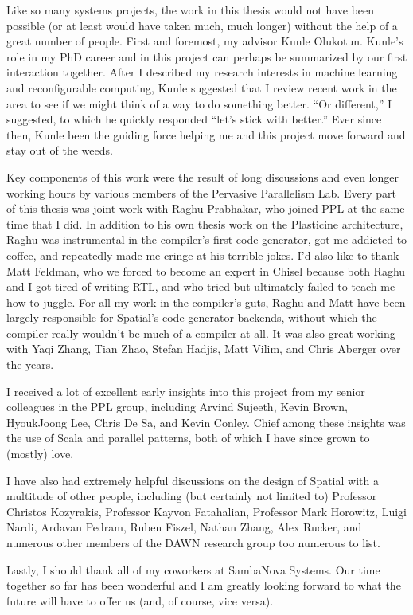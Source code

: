 Like so many systems projects, the work in this thesis would not have been
possible (or at least would have taken much, much longer) without the help of
a great number of people. First and foremost, my advisor Kunle Olukotun.
Kunle's role in my PhD career and in this project can perhaps be summarized by
our first interaction together. After I described my research interests in
machine learning and reconfigurable computing, Kunle suggested that I review recent
work in the area to see if we might think of a way to do something better.
``Or different,'' I suggested, to which he quickly responded ``let's stick
with better.''  Ever since then, Kunle been the guiding force helping me and this
project move forward and stay out of the weeds.

Key components of this work were the result of long discussions and even longer
working hours by various members of the Pervasive Parallelism Lab.
Every part of this thesis was joint work with Raghu Prabhakar, who joined PPL
at the same time that I did. In addition to his own thesis work on the Plasticine
architecture, Raghu was instrumental in the compiler's
first code generator, got me addicted to coffee,
and repeatedly made me cringe at his terrible jokes.
I'd also like to thank Matt Feldman, who we forced to become an expert in Chisel
because both Raghu and I got tired of writing RTL,
and who tried but ultimately failed to teach me how to juggle.
For all my work in the compiler's guts, Raghu and Matt have been largely
responsible for Spatial's code generator backends, without which the
compiler really wouldn't be much of a compiler at all.
It was also great working with Yaqi Zhang, Tian Zhao, Stefan Hadjis, Matt Vilim,
and Chris Aberger over the years.

I received a lot of excellent early insights into this project from my senior
colleagues in the PPL group, including Arvind Sujeeth, Kevin Brown, HyoukJoong
Lee, Chris De Sa, and Kevin Conley. Chief among these insights was the use of
Scala and parallel patterns, both of which I have since grown to (mostly) love.

I have also had extremely helpful discussions on the design of Spatial
with a multitude of other people, including (but certainly not limited to)
Professor Christos Kozyrakis, Professor Kayvon Fatahalian, Professor Mark Horowitz,
Luigi Nardi, Ardavan Pedram, Ruben Fiszel, Nathan Zhang, Alex Rucker, and
numerous other members of the DAWN research group too numerous to list.


Lastly, I should thank all of my coworkers at SambaNova Systems. Our time
together so far has been wonderful and I am greatly looking forward to what
the future will have to offer us (and, of course, vice versa).
